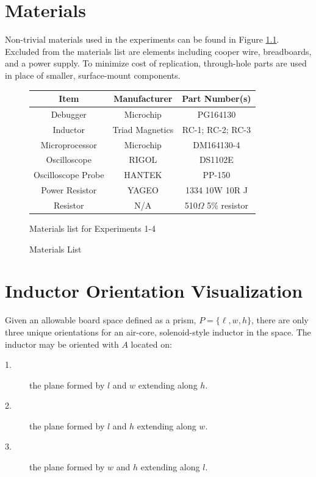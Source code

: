 \documentclass[11pt,oneside]{report}
\begin{document}
    \startappendices
    
    \chapter{Materials}\label{appendix:materials}
    Non-trivial materials used in the experiments can be found in Figure \ref{fig:Materials}. Excluded from the materials list are elements including cooper wire, breadboards, and a power supply. To minimize cost of replication, through-hole parts are used in place of smaller, surface-mount components.
    \begin{figure}[!htbp]
    	\centering	
    	\bgroup
    	\def\arraystretch{1.25}%
    	\begin{tabular}{| c | c | c |}
      		\hline			
      		Item & Manufacturer & Part Number(s)\\ \hline \hline \cline{1-3}
      		Debugger & Microchip & PG164130\\ \hline
      		Inductor & Triad Magnetics & RC-1; RC-2; RC-3\\ \hline
      		Microprocessor & Microchip & DM164130-4\\ \hline
      		Oscilloscope & RIGOL & DS1102E\\ \hline
      		Oscilloscope Probe & HANTEK & PP-150\\  \hline  
      		Power Resistor & YAGEO & 1334 10W 10R J\\  \hline  
      		Resistor & N/A & 510$\Omega$ 5\% resistor\\  \hline  
    	\end{tabular}
    	\egroup
        \caption{Materials List}Materials list for Experiments 1-4
        \label{fig:Materials}
    \end{figure}

    \chapter{Inductor Orientation Visualization}\label{appendix:orientation-visualization}
    Given an allowable board space defined as a prism, $P = \{\ell, w, h\}$, there are only three unique orientations for an air-core, solenoid-style inductor in the space. The inductor may be oriented with $A$ located on:
    \begin{description}
    \item[1.] the plane formed by $l$ and $w$ extending along $h$.
    \item[2.] the plane formed by $l$ and $h$ extending along $w$.
    \item[3.] the plane formed by $w$ and $h$ extending along $l$.
    \end{description}
\end{document}
